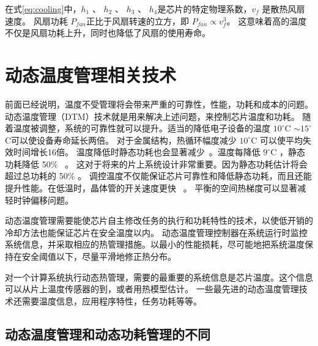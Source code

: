 在式\eqref{eq:cooling}中，$h_1$ 、 $h_2$ 、 $h_3$ 、 $h_4$是芯片的特定物理系数，$v_f$ 是散热风扇速度。
风扇功耗 $P_{fan}$正比于风扇转速的立方，即 $P_{fan} \propto v_f^3$。
这意味着高的温度不仅是风扇功耗上升，同时也降低了风扇的使用寿命。

\section{动态温度管理相关技术}\label{sec:DTM}

前面已经说明，温度不受管理将会带来严重的可靠性，性能，功耗和成本的问题。
动态温度管理（DTM）技术就是用来解决上述问题，来控制芯片温度和功耗。
随着温度被调整，系统的可靠性就可以提升。适当的降低电子设备的温度 $10^{\circ}$C $\sim 15^{\circ}$C可以使设备寿命延长两倍。
对于金属结构，热循环幅度减少 $10^{\circ}$C 可以使平均失效时间增长16倍。
温度降低时静态功耗也会显著减少~\cite{kursun2006investigating}。温度每降低 $9^{\circ}$C ，静态功耗降低 50\%~\cite{liu2007accurate} 。
这对于将来的片上系统设计非常重要。因为静态功耗估计将会超过总功耗的 50\% 。
调控温度不仅能保证芯片可靠性和降低静态功耗，而且还能提升性能。在低温时，晶体管的开关速度更快~\cite{pamula2003cooling} 。
平衡的空间热梯度可以显著减轻时钟偏移问题。

动态温度管理需要能使芯片自主修改任务的执行和功耗特性的技术，以使低开销的冷却方法也能保证芯片在安全温度以内。
动态温度管理控制器在系统运行时监控系统信息，并采取相应的热管理措施。以最小的性能损耗，尽可能地把系统温度保持在安全阈值以下，尽量平滑地修正热分布。

对一个计算系统执行动态热管理，需要的最重要的系统信息是芯片温度。这个信息可以从片上温度传感器的到，或者用热模型估计。
一些最先进的动态温度管理技术还需要温度信息，应用程序特性，任务功耗等等。

\subsection{动态温度管理和动态功耗管理的不同}\label{sec:DPM}

